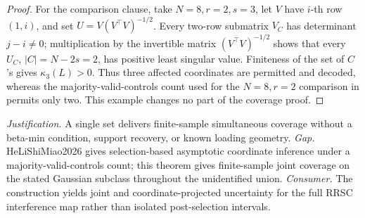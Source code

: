 \documentclass{article}
\begin{document}
\begin{proof}
For the comparison clause, take \(N=8,r=2,s=3\), let \(V\) have \(i\)-th row \((1,i)\), and set \(U=V(V^{\top}V)^{-1/2}\).  Every two-row submatrix \(V_C\) has determinant \(j-i\ne0\); multiplication by the invertible matrix \((V^{\top}V)^{-1/2}\) shows that every \(U_C\), \(|C|=N-2s=2\), has positive least singular value.  Finiteness of the set of \(C\)'s gives \(\kappa_3(L)>0\).  Thus three affected coordinates are permitted and decoded, whereas the majority-valid-controls count used for the \(N=8,r=2\) comparison in \cite{HeLiShiMiao2026} permits only two.  This example changes no part of the coverage proof.
\end{proof}
\par\smallskip\noindent \textit{Justification.} A single set delivers finite-sample simultaneous coverage without a beta-min condition, support recovery, or known loading geometry. \textit{Gap.} HeLiShiMiao2026 gives selection-based asymptotic coordinate inference under a majority-valid-controls count; this theorem gives finite-sample joint coverage on the stated Gaussian subclass throughout the unidentified union. \textit{Consumer.} The construction yields joint and coordinate-projected uncertainty for the full RRSC interference map rather than isolated post-selection intervals.
\end{document}
